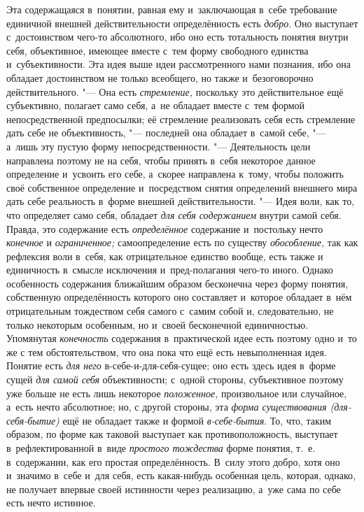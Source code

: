 Эта содержащаяся в~понятии, равная ему и~заключающая в~себе
требование единичной внешней действительности определённость
есть {\em добро}.
Оно выступает с~достоинством чего-то абсолютного, ибо оно
есть тотальность понятия внутри себя, объективное, имеющее вместе с~тем
форму свободного единства и~субъективности. Эта идея выше идеи
рассмотренного нами познания, ибо она обладает достоинством не только
всеобщего, но также и~безоговорочно действительного. "--- Она
есть {\em стремление,}
поскольку это действительное ещё субъективно, полагает само
себя, а~не обладает вместе с~тем формой непосредственной предпосылки; её
стремление реализовать себя есть стремление дать себе не объективность, "---
последней она обладает в~самой себе, "--- а~лишь
эту пустую форму непосредственности. "--- Деятельность цели
направлена поэтому не на себя, чтобы принять в~себя некоторое данное
определение и~усвоить его себе, а~скорее направлена к~тому, чтобы положить
своё собственное определение и~посредством снятия определений внешнего мира
дать себе реальность в~форме внешней действительности. "---
Идея воли, как то, что определяет само себя, обладает
{\em для себя содержанием}
внутри самой себя. Правда, это содержание есть
{\em определённое}
содержание и~постольку нечто
{\em конечное} и
{\em ограниченное;}
самоопределение есть по существу
{\em обособление,} так
как рефлексия воли в~себя, как отрицательное единство вообще, есть также и
единичность в~смысле исключения и~пред-полагания чего-то
иного. Однако особенность содержания ближайшим образом бесконечна через
форму понятия, собственную определённость которого оно составляет и~которое
обладает в~нём отрицательным тождеством себя самого с~самим собой и,
следовательно, не только некоторым особенным, но и~своей бесконечной
единичностью. Упомянутая
{\em конечность}
содержания в~практической идее есть поэтому одно и~то же с
тем обстоятельством, что она пока что ещё есть невыполненная идея. Понятие
есть {\em для него}
в-себе-и-для-себя-сущее; оно есть здесь идея в~форме сущей
{\em для самой себя}
объективности; с~одной стороны, субъективное поэтому уже
больше не есть лишь некоторое
{\em положенное,}
произвольное или случайное, а~есть нечто абсолютное; но, с
другой стороны, эта {\em форма
существования (для-себя-бытие)} ещё не обладает также и
формой {\em в-себе-бытия}.
То, что, таким образом, по форме как таковой выступает как
противоположность, выступает в~рефлектированной в~виде
{\em простого тождества}
форме понятия, т.~е. в~содержании, как его простая
определённость. В~силу этого добро, хотя оно и~значимо в~себе и~для себя,
есть какая-нибудь особенная цель, которая, однако, не получает впервые
своей истинности через реализацию, а~уже сама по себе есть нечто
истинное.

